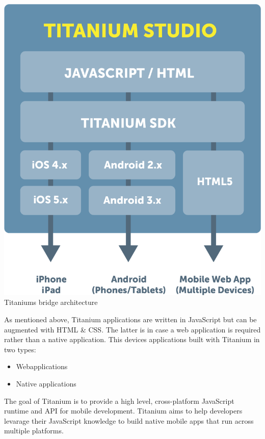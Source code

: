 \begin{centering}
	\includegraphics[scale=0.25]{images/titanium_architecture.png}\\{Titaniums bridge architecture\cite{Inc2012a}}\\
\end{centering}

As mentioned above, Titanium applications are written in JavaScript but can be augmented with HTML \& CSS. The latter is in case a web application is required rather than a native application. This devices applications built with Titanium in two types:
\begin{itemize}
	\item
	Webapplications
	\item
	Native applications
\end{itemize}

The goal of Titanium is to provide a high level, cross-platform JavaScript runtime and API for mobile development.\cite{Whinnery2012} Titanium aims to help developers levarage their JavaScript knowledge to build native mobile apps that run across multiple platforms.


